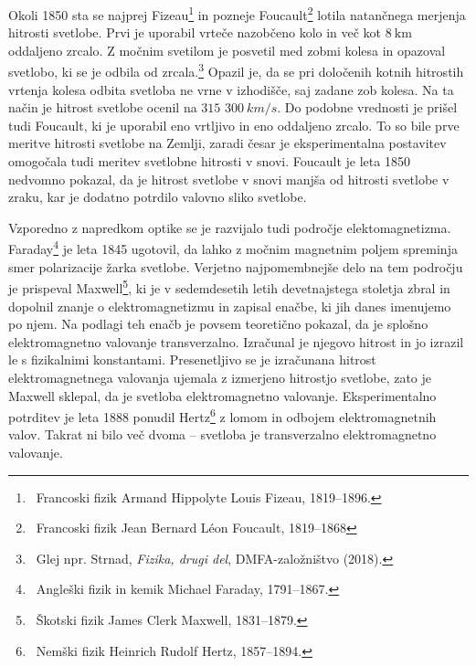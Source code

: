Okoli 1850 sta se najprej Fizeau\footnote{~Francoski fizik Armand Hippolyte
Louis Fizeau, 1819--1896.} in pozneje Foucault\footnote{~Francoski fizik
Jean Bernard L\'{e}on Foucault, 1819--1868} lotila natančnega
merjenja hitrosti svetlobe. Prvi je uporabil vrteče nazobčeno kolo 
in več kot $8~\si{\kilo\meter}$ oddaljeno zrcalo. Z močnim svetilom je posvetil med
zobmi kolesa in opazoval svetlobo, ki se je odbila od 
zrcala.\footnote{~Glej npr. Strnad, {\it Fizika, drugi del}, 
DMFA-založništvo (2018).} Opazil je, da se pri določenih kotnih hitrostih 
vrtenja kolesa odbita svetloba ne vrne v izhodišče, saj zadane zob kolesa. 
Na ta način je hitrost svetlobe ocenil na $315\,\,300~\si{km/s}$. Do podobne
vrednosti je prišel tudi Foucault, ki je uporabil eno vrtljivo in eno oddaljeno 
zrcalo. To so bile prve meritve hitrosti svetlobe na Zemlji, zaradi česar
je eksperimentalna postavitev omogočala tudi meritev 
svetlobne hitrosti v snovi. Foucault je leta 1850 nedvomno pokazal, 
da je hitrost svetlobe v snovi manjša od hitrosti svetlobe v zraku, kar je dodatno
potrdilo valovno sliko svetlobe. 

Vzporedno z napredkom optike se je razvijalo tudi področje
elektomagnetizma. Faraday\footnote{~Angleški fizik in kemik Michael Faraday, 1791--1867.} 
je leta 1845 ugotovil, da lahko z močnim magnetnim poljem spreminja
smer polarizacije žarka svetlobe. Verjetno najpomembnejše delo
na tem področju je prispeval Maxwell\footnote{~Škotski fizik James Clerk Maxwell, 
1831--1879.}, ki je v sedemdesetih letih devetnajstega stoletja
zbral in dopolnil znanje o elektromagnetizmu in zapisal enačbe, ki jih 
danes imenujemo po njem. Na podlagi teh enačb je povsem 
teoretično pokazal, da je splošno elektromagnetno valovanje 
transverzalno. Izračunal je njegovo hitrost in jo
izrazil le s fizikalnimi konstantami. Presenetljivo se je izračunana 
hitrost elektromagnetnega valovanja ujemala 
z izmerjeno hitrostjo svetlobe, zato je Maxwell sklepal, da je svetloba 
elektromagnetno valovanje. Eksperimentalno potrditev je leta
1888 ponudil Hertz\footnote{~Nemški fizik 
Heinrich Rudolf Hertz, 1857--1894.} z lomom in odbojem elektromagnetnih 
valov. Takrat ni bilo več dvoma -- svetloba je transverzalno 
elektromagnetno valovanje. 

